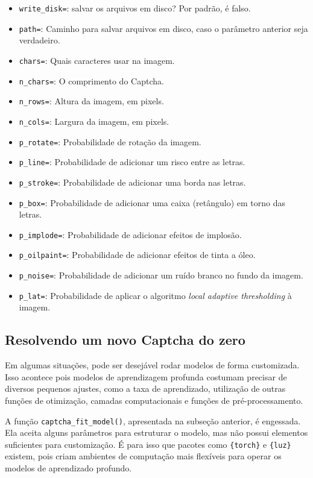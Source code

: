 \documentclass[12pt,twoside,brazilian]{book}
\providecommand{\tightlist}{%
  \setlength{\itemsep}{0pt}\setlength{\parskip}{0pt}}
\begin{document}
\begin{itemize}
\tightlist
\item
  \texttt{write\_disk=}: salvar os arquivos em disco? Por padrão, é
  falso.
\item
  \texttt{path=}: Caminho para salvar arquivos em disco, caso o
  parâmetro anterior seja verdadeiro.
\item
  \texttt{chars=}: Quais caracteres usar na imagem.
\item
  \texttt{n\_chars=}: O comprimento do Captcha.
\item
  \texttt{n\_rows=}: Altura da imagem, em pixels.
\item
  \texttt{n\_cols=}: Largura da imagem, em pixels.
\item
  \texttt{p\_rotate=}: Probabilidade de rotação da imagem.
\item
  \texttt{p\_line=}: Probabilidade de adicionar um risco entre as
  letras.
\item
  \texttt{p\_stroke=}: Probabilidade de adicionar uma borda nas letras.
\item
  \texttt{p\_box=}: Probabilidade de adicionar uma caixa (retângulo) em
  torno das letras.
\item
  \texttt{p\_implode=}: Probabilidade de adicionar efeitos de implosão.
\item
  \texttt{p\_oilpaint=}: Probabilidade de adicionar efeitos de tinta a
  óleo.
\item
  \texttt{p\_noise=}: Probabilidade de adicionar um ruído branco no
  fundo da imagem.
\item
  \texttt{p\_lat=}: Probabilidade de aplicar o algoritmo \emph{local
  adaptive thresholding} à imagem.
\end{itemize}

\hypertarget{sec-captcha-do-zero}{%
\subsection{Resolvendo um novo Captcha do
zero}\label{sec-captcha-do-zero}}

Em algumas situações, pode ser desejável rodar modelos de forma
customizada. Isso acontece pois modelos de aprendizagem profunda
costumam precisar de diversos pequenos ajustes, como a taxa de
aprendizado, utilização de outras funções de otimização, camadas
computacionais e funções de pré-processamento.

A função \texttt{captcha\_fit\_model()}, apresentada na subseção
anterior, é engessada. Ela aceita alguns parâmetros para estruturar o
modelo, mas não possui elementos suficientes para customização. É para
isso que pacotes como \texttt{\{torch\}} e \texttt{\{luz\}} existem,
pois criam ambientes de computação mais flexíveis para operar os modelos
de aprendizado profundo.
\end{document}
